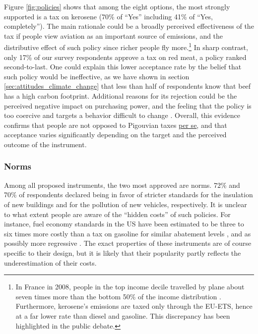 \documentclass[english,5p,authoryear]{elsarticle}
\begin{document}
%
%
%
Figure \ref{fig:policies} shows that among the eight options, the most strongly supported is a tax on kerosene (70\% of ``Yes'' including 41\% of ``Yes, completely''). The main rationale could be a broadly perceived effectiveness of the tax if people view aviation as an important source of emissions, and the distributive effect of such policy since richer people fly more.\footnote{In France in 2008, people in the top income decile travelled by plane about seven times more than the bottom 50\% of the income distribution \citep{pappalardo_mobilite_2010}. Furthermore, kerosene's emissions are taxed only through the EU-ETS, hence at a far lower rate than diesel and gasoline. This discrepancy has been highlighted in the public debate.} In sharp contrast, only 17\% of our survey respondents approve a tax on red meat, a policy ranked second-to-last. One could explain this lower acceptance rate by the belief that such policy would be ineffective, as we have shown in section \ref{sec:attitudes_climate_change} that less than half of respondents know that beef has a high carbon footprint. Additional reasons for its rejection could be the perceived negative impact on purchasing power, and the feeling that the policy is too coercive and targets a behavior difficult to change \citep{de_groot_schuitema_2012}. Overall, this evidence confirms that people are not opposed to Pigouvian taxes \uline{per se}, and that acceptance varies significantly depending on the target and the perceived outcome of the instrument.

%

%

        \subsubsection{Norms}

Among all proposed instruments, the two most approved are norms. 72\% and 70\% of respondents declared being in favor of stricter standards for the insulation of new buildings and for the pollution of new vehicles, respectively. It is unclear to what extent people are aware of the ``hidden costs'' of such policies. For instance, fuel economy standards in the US have been estimated to be three to six times more costly than a tax on gasoline for similar abatement levels \citep{jacobsen_2013}, and as possibly more regressive \citep{jacobsen_2013, davis_knittel_2019, levinson_2019}. The exact properties of these instruments are of course specific to their design, but it is likely that their popularity partly reflects the underestimation of their costs.
\end{document}
